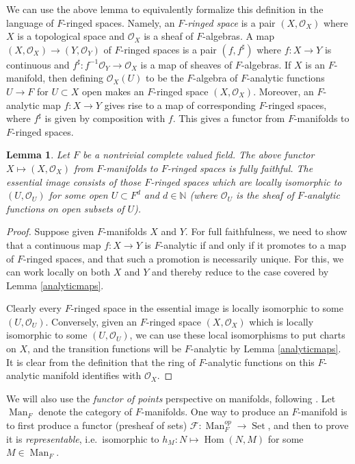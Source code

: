 \documentclass[12pt]{article}
\newtheorem{lemma}[theorem]{Lemma}
\begin{document}
We can use the above lemma to equivalently formalize this definition in the language of $F$-ringed spaces.  Namely, an \emph{$F$-ringed space} is a pair $(X,\mathcal{O}_X)$ where $X$ is a topological space and $\mathcal{O}_X$ is a sheaf of $F$-algebras.  A map $(X,\mathcal{O}_X)\rightarrow (Y,\mathcal{O}_Y)$ of $F$-ringed spaces is a pair $(f,f^\sharp)$ where $f:X\rightarrow Y$ is continuous and $f^\sharp:f^{-1}\mathcal{O}_Y\rightarrow \mathcal{O}_X$ is a map of sheaves of $F$-algebras.  If $X$ is an $F$-manifold, then defining $\mathcal{O}_X(U)$ to be the $F$-algebra of $F$-analytic functions $U\rightarrow F$ for $U\subset X$ open makes an $F$-ringed space $(X,\mathcal{O}_X)$.  Moreover, an $F$-analytic map $f:X\rightarrow Y$ gives rise to a map of corresponding $F$-ringed spaces, where $f^\sharp$ is given by composition with $f$.  This gives a functor from $F$-manifolds to $F$-ringed spaces.

\begin{lemma}
Let $F$ be a nontrivial complete valued field.   The above functor $X\mapsto (X,\mathcal{O}_X)$ from $F$-manifolds to $F$-ringed spaces is fully faithful.  The essential image consists of those $F$-ringed spaces which are locally isomorphic to $(U,\mathcal{O}_U)$ for some open $U\subset F^d$ and $d\in\mathbb{N}$ (where $\mathcal{O}_U$ is the sheaf of $F$-analytic functions on open subsets of $U$).
\end{lemma}

\begin{proof}
Suppose given $F$-manifolds $X$ and $Y$.  For full faithfulness, we need to show that a continuous map $f:X\rightarrow Y$ is $F$-analytic if and only if it promotes to a map of $F$-ringed spaces, and that such a promotion is necessarily unique.  For this, we can work locally on both $X$ and $Y$ and thereby reduce to the case covered by Lemma \ref{analyticmaps}.

Clearly every $F$-ringed space in the essential image is locally isomorphic to some $(U,\mathcal{O}_U)$.  Conversely, given an $F$-ringed space $(X,\mathcal{O}_X)$ which is locally isomorphic to some $(U,\mathcal{O}_U)$, we can use these local isomorphisms to put charts on $X$, and the transition functions will be $F$-analytic by Lemma \ref{analyticmaps}.  It is clear from the definition that the ring of $F$-analytic functions on this $F$-analytic manifold identifies with $\mathcal{O}_X$.
\end{proof}

We will also use the \emph{functor of points} perspective on manifolds, following \cite{GrothendieckAnalytic}.  Let $\operatorname{Man}_F$ denote the category of $F$-manifolds.  One way to produce an $F$-manifold is to first produce a functor (presheaf of sets) $\mathcal{F}:\operatorname{Man}_F^{op}\rightarrow\operatorname{Set}$, and then  to prove it is \emph{representable}, i.e.\ isomorphic to $h_M: N\mapsto \operatorname{Hom}(N,M)$ for some $M\in\operatorname{Man}_F$.
\end{document}
